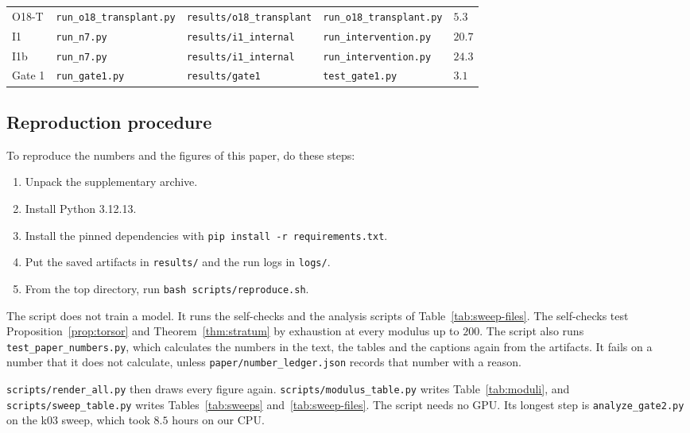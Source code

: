 \begin{table}[ht]
\begin{tabular}{lllll}
    O18-T & \texttt{run\_o18\_transplant.py} & \texttt{results/o18\_transplant} & \texttt{run\_o18\_transplant.py} & $5.3$ \\
    I1 & \texttt{run\_n7.py} & \texttt{results/i1\_internal} & \texttt{run\_intervention.py} & $20.7$ \\
    I1b & \texttt{run\_n7.py} & \texttt{results/i1\_internal} & \texttt{run\_intervention.py} & $24.3$ \\
    Gate 1 & \texttt{run\_gate1.py} & \texttt{results/gate1} & \texttt{test\_gate1.py} & $3.1$ \\
    \bottomrule
  \end{tabular}
\end{table}

\subsection{Reproduction procedure}
\label{sec:repro-procedure}

To reproduce the numbers and the figures of this paper, do these steps:
\begin{enumerate}
  \item Unpack the supplementary archive.
  \item Install Python 3.12.13.
  \item Install the pinned dependencies with \texttt{pip install -r requirements.txt}.
  \item Put the saved artifacts in \texttt{results/} and the run logs in \texttt{logs/}.
  \item From the top directory, run \texttt{bash scripts/reproduce.sh}.
\end{enumerate}

The script does not train a model. It runs the self-checks and the analysis scripts of
Table~\ref{tab:sweep-files}. The self-checks test Proposition~\ref{prop:torsor} and
Theorem~\ref{thm:stratum} by exhaustion at every modulus up to $200$. The script also runs
\texttt{test\_paper\_numbers.py}, which calculates the numbers in the text, the tables and the
captions again from the artifacts. It fails on a number that it does not calculate, unless
\texttt{paper/number\_ledger.json} records that number with a reason.

\texttt{scripts/render\_all.py} then draws every figure again.
\texttt{scripts/modulus\_table.py} writes Table~\ref{tab:moduli}, and
\texttt{scripts/sweep\_table.py} writes Tables~\ref{tab:sweeps} and~\ref{tab:sweep-files}. The
script needs no GPU. Its longest step is \texttt{analyze\_gate2.py} on the k03 sweep, which
took $8.5$ hours on our CPU.

